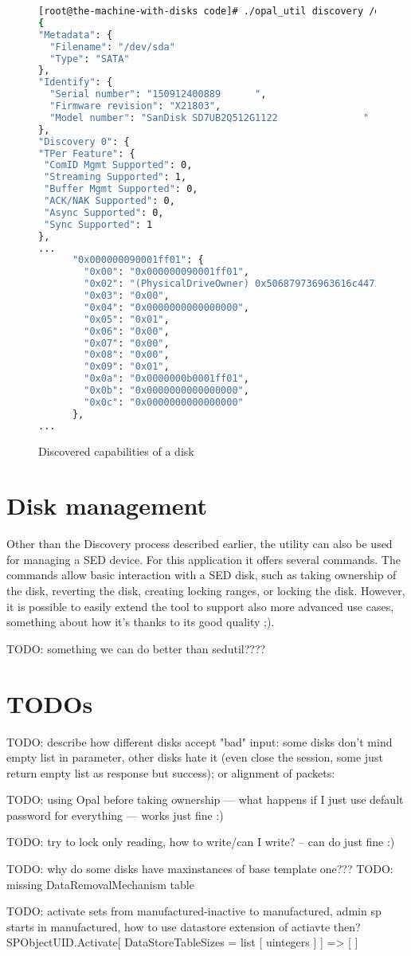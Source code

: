 \begin{figure}
    \centering
    \begin{lstlisting}[language=Bash]
[root@the-machine-with-disks code]# ./opal_util discovery /dev/sda 2>/dev/null
{
"Metadata": {
  "Filename": "/dev/sda"
  "Type": "SATA"
},
"Identify": {
  "Serial number": "150912400889      ",
  "Firmware revision": "X21803",
  "Model number": "SanDisk SD7UB2Q512G1122               "
},
"Discovery 0": {
"TPer Feature": {
 "ComID Mgmt Supported": 0,
 "Streaming Supported": 1,
 "Buffer Mgmt Supported": 0,
 "ACK/NAK Supported": 0,
 "Async Supported": 0,
 "Sync Supported": 1
},
...
      "0x000000090001ff01": {
        "0x00": "0x000000090001ff01",
        "0x02": "(PhysicalDriveOwner) 0x506879736963616c44726976654f776e6572",
        "0x03": "0x00",
        "0x04": "0x0000000000000000",
        "0x05": "0x01",
        "0x06": "0x00",
        "0x07": "0x00",
        "0x08": "0x00",
        "0x09": "0x01",
        "0x0a": "0x0000000b0001ff01",
        "0x0b": "0x0000000000000000",
        "0x0c": "0x0000000000000000"
      },
...
    \end{lstlisting}
    \caption{Discovered capabilities of a disk}
    \label{fig:code}
\end{figure}

\section{Disk management}

Other than the Discovery process described earlier, the utility can also be used for managing a SED device. For this application it offers several commands.
The commands allow basic interaction with a SED disk, such as taking ownership of the disk, reverting the disk, creating locking ranges, or locking the disk. However, it is possible to easily extend the tool to support also more advanced use cases, something about how it's thanks to its good quality ;).

TODO: something we can do better than sedutil????

\section{TODOs}

TODO: describe how different disks accept "bad" input: some disks don't mind empty list in parameter, other disks hate it (even close the session, some just return empty list  as response but success); or alignment of packets: 

TODO:  using Opal before taking ownership --- what happens if I just use default password for everything --- works just fine :)

TODO: try to lock only reading, how to write/can I write? -- can do just fine :)

TODO: why do some disks have maxinstances of base template one???
TODO: missing DataRemovalMechanism table



TODO: activate sets from manufactured-inactive to manufactured, admin sp starts in manufactured, how to use datastore extension of actiavte then?
SPObjectUID.Activate[
DataStoreTableSizes = list [ uintegers ]
]
=>
[ ]